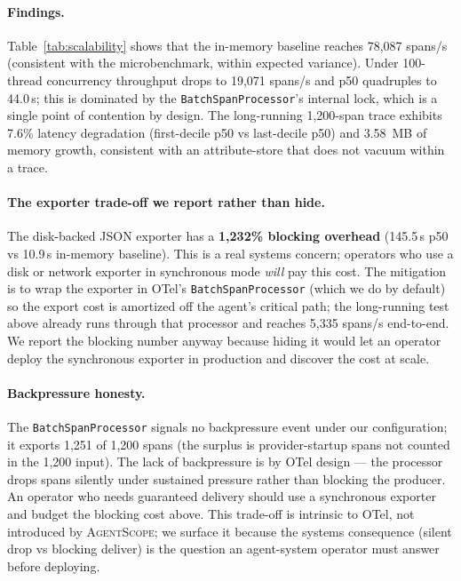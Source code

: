 \documentclass[sigplan,10pt,anonymous,review]{acmart}
\newcommand{\sysname}{\textsc{AgentScope}\xspace}
\begin{document}
\paragraph{Findings.}
Table~\ref{tab:scalability} shows that the in-memory baseline reaches
78{,}087 spans/s (consistent with the microbenchmark, within
expected variance). Under 100-thread concurrency throughput drops to
19{,}071 spans/s and p50 quadruples to 44.0\,\textmu{}s; this is
dominated by the \texttt{BatchSpanProcessor}'s internal lock, which is
a single point of contention by design. The long-running 1{,}200-span
trace exhibits 7.6\% latency degradation (first-decile p50 vs
last-decile p50) and 3.58~MB of memory growth, consistent with an
attribute-store that does not vacuum within a trace.

\paragraph{The exporter trade-off we report rather than hide.}
The disk-backed JSON exporter has a \textbf{1{,}232\% blocking
overhead} (145.5\,\textmu{}s p50 vs 10.9\,\textmu{}s in-memory
baseline). This is a real systems concern; operators who use a disk or
network exporter in synchronous mode \emph{will} pay this cost. The
mitigation is to wrap the exporter in OTel's
\texttt{BatchSpanProcessor} (which we do by default) so the export
cost is amortized off the agent's critical path; the long-running test
above already runs through that processor and reaches 5{,}335 spans/s
end-to-end. We report the blocking number anyway because hiding it
would let an operator deploy the synchronous exporter in production and
discover the cost at scale.

\paragraph{Backpressure honesty.} The
\texttt{BatchSpanProcessor} signals no backpressure event under our
configuration; it exports 1{,}251 of 1{,}200 spans (the surplus is
provider-startup spans not counted in the 1{,}200 input). The lack of
backpressure is by OTel design --- the processor drops spans silently
under sustained pressure rather than blocking the producer. An
operator who needs guaranteed delivery should use a synchronous
exporter and budget the blocking cost above. This trade-off is
intrinsic to OTel, not introduced by \sysname; we surface it because
the systems consequence (silent drop vs blocking deliver) is the
question an agent-system operator must answer before deploying.
\end{document}
